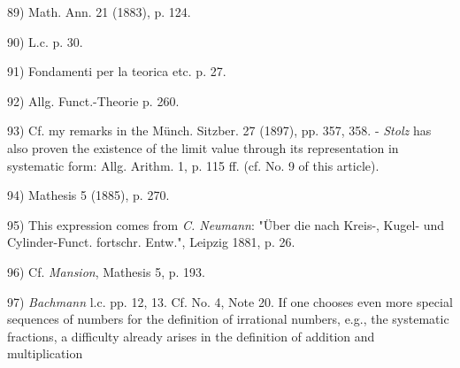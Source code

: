 \vspace{-0.2cm}
\leftline{\rule{2in}{0.4pt}}
\vspace{0.1cm}
{
\footnotesize
89) Math. Ann. 21 (1883), p. 124.

90) L.c. p. 30.

91) Fondamenti per la teorica etc. p. 27.

92) Allg. Funct.-Theorie p. 260.

93) Cf. my remarks in the Münch. Sitzber. 27 (1897), pp. 357, 358. - \textit{Stolz} has also proven the existence of the limit value through its representation in systematic form: Allg. Arithm. 1, p. 115 ff. (cf. No. 9 of this article).

94) Mathesis 5 (1885), p. 270.

95) This expression comes from \textit{C. Neumann}: "Über die nach Kreis-, Kugel- und Cylinder-Funct. fortschr. Entw.", Leipzig 1881, p. 26.

96) Cf. \textit{Mansion}, Mathesis 5, p. 193.

97) \textit{Bachmann} l.c. pp. 12, 13. Cf. No. 4, Note 20. If one chooses even more special sequences of numbers for the definition of irrational numbers, e.g., the systematic fractions, a difficulty already arises in the definition of addition and multiplication

}